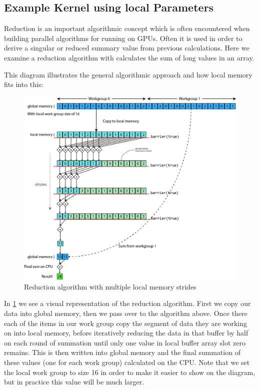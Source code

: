 \documentclass[conc-doc]{subfiles}
\begin{document}
\subsection{Example Kernel using local Parameters}
Reduction is an important algorithmic concept which is often encountered when building parallel algorithms for running on GPUs. Often it is used in order to derive a singular or reduced summary value from previous calculations. Here we examine a reduction algorithm with calculates the sum of long values in an array.

This diagram illustrates the general algorithmic approach and how local memory fits into this:

\begin{figure}[H]
	\centerline{\includegraphics[width=\textwidth]{images/gpu-reduction.png}}
	\caption{Reduction algorithm with multiple local memory strides}
	\label{fig:reduction}
\end{figure}

In \ref{fig:reduction} we see a visual representation of the reduction algorithm. First we copy our data into global memory, then we pass over to the algorithm above. Once there each of the items in our work group copy the segment of data they are working on into local memory, before iteratively reducing the data in that buffer by half on each round of summation until only one value in local buffer array slot zero remains. This is then written into global memory and the final summation of these values (one for each work group) calculated on the CPU. Note that we set the local work group to size 16 in order to make it easier to show on the diagram, but in practice this value will be much larger.
\end{document}
